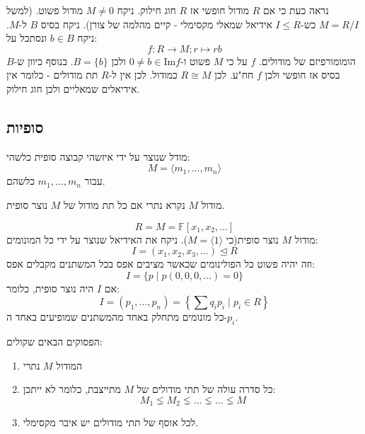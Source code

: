 \documentclass{tstextbook}
\begin{document}
נראה כעת כי אם \(R\) מודול חופשי אז \(R\) חוג חילוק. ניקח \(M\neq 0\) מודול פשוט. (למשל \(M = R / I\) כש-\(I\leq R\) אידיאל שמאלי מקסימלי - קיים מהלמה של צורן).
ניקח בסיס \(B\) ל-\(M\). ניקח \(b\in B\) ונסתכל על:
$$f:R\to M; r\mapsto rb$$
הומומורפיזם של מודולים. \(f\) על כי \(M\) פשוט ו-\(0\neq b \in \mathrm{Im} f\) ולכן \(B=\{ b \}\). בנוסף כיוון ש-\(B\) בסיס אז חופשי ולכן \(f\) חח"ע. לכן \(R\cong M\) כמודול. לכן אין ל-\(R\) תת מודולים - כלומר אין אידיאלים שמאליים ולכן חוג חילוק.

\subsection{סופיות}

\begin{definition}
מודל שנוצר על ידי איזשהי קבוצה סופית כלשהי:
$$M=\langle m_{1},\dots,m_{n} \rangle $$
עבור \(m_{1},\dots ,m_{n}\) כלשהם.

\end{definition}
\begin{definition}
מודול \(M\) נקרא נתרי אם כל תת מודול של \(M\) נוצר סופית.

\end{definition}
\begin{example}
$$R=M=\mathbb{F} [x_{1},x_{2},\dots]$$
מודול \(M\) נוצר סופית(כי \(M=\langle 1 \rangle\)).
ניקח את האידיאל שנוצר על ידי כל המונומים:
$$I=(x_{1},x_{2},x_{3},\dots)\trianglelefteq  R$$
וזה יהיה פשוט כל הפולינומים שכאשר מציבים אפס בכל המשתנים מקבלים אפס:
$$I=\{ p\mid p(0,0,0,\dots)=0 \}$$
אם \(I\) היה נוצר סופית, כלומר:
$$I=(p_{1},\dots, p_{n})=\left\{  \sum q_{i}p_{i}\mid p_{i}\in R  \right\}$$
כל מונומים מתחלק באחד מהמשתנים שמופיעים באחד ה-\(p_{i}\).

\end{example}
\begin{proposition}
הפסוקים הבאים שקולים:

  \begin{enumerate}
    \item המודול \(M\) נתרי 


    \item כל סדרה עולה של תתי מודולים של \(M\) מתייצבת, כלומר לא ייתכן: 
$$M_{1} \lneq M_{2}\lneq \dots \lneq \dots \lneq M$$


    \item לכל אוסף של תתי מודולים יש איבר מקסימלי. 


  \end{enumerate}
\end{proposition}
\end{document}
